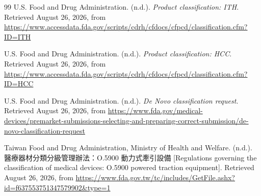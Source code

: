 \documentclass[12pt,a4paper]{article}
\begin{document}
\begin{thebibliography}{99}
    U.S. Food and Drug Administration. (n.d.). \emph{Product classification: ITH}.
    Retrieved August 26, 2026, from
    \url{https://www.accessdata.fda.gov/scripts/cdrh/cfdocs/cfpcd/classification.cfm?ID=ITH}

    U.S. Food and Drug Administration. (n.d.). \emph{Product classification: HCC}.
    Retrieved August 26, 2026, from
    \url{https://www.accessdata.fda.gov/scripts/cdrh/cfdocs/cfpcd/classification.cfm?ID=HCC}

    U.S. Food and Drug Administration. (n.d.). \emph{De Novo classification request}.
    Retrieved August 26, 2026, from
    \url{https://www.fda.gov/medical-devices/premarket-submissions-selecting-and-preparing-correct-submission/de-novo-classification-request}

    Taiwan Food and Drug Administration, Ministry of Health and Welfare. (n.d.).
    醫療器材分類分級管理辦法：O.5900 動力式牽引設備
    [Regulations governing the classification of medical devices: O.5900 powered traction equipment].
    Retrieved August 26, 2026, from
    \url{https://www.fda.gov.tw/tc/includes/GetFile.ashx?id=f637553751347579902&type=1}

\end{thebibliography}
\end{document}
